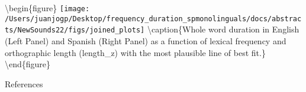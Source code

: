 \documentclass[
  12pt,
]{article}
\begin{document}
\clearpage

\textbackslash begin\{figure\}
\texttt{[image: /Users/juanjogp/Desktop/frequency\_duration\_spmonolinguals/docs/abstracts/NewSounds22/figs/joined\_plots]}
\textbackslash caption\{Whole word duration in English (Left Panel) and
Spanish (Right Panel) as a function of lexical frequency and
orthographic length (length\_z) with the most plausible line of best
fit.\}\label{fig:plot-joined} \textbackslash end\{figure\}

\begin{center}
References
\end{center}

\begingroup
\setlength{\parindent}{-0.5in}
\setlength{\leftskip}{0.5in}

\phantom{.}

\textcolor{white}{\\} \vspace{-0.5in}
\end{document}

